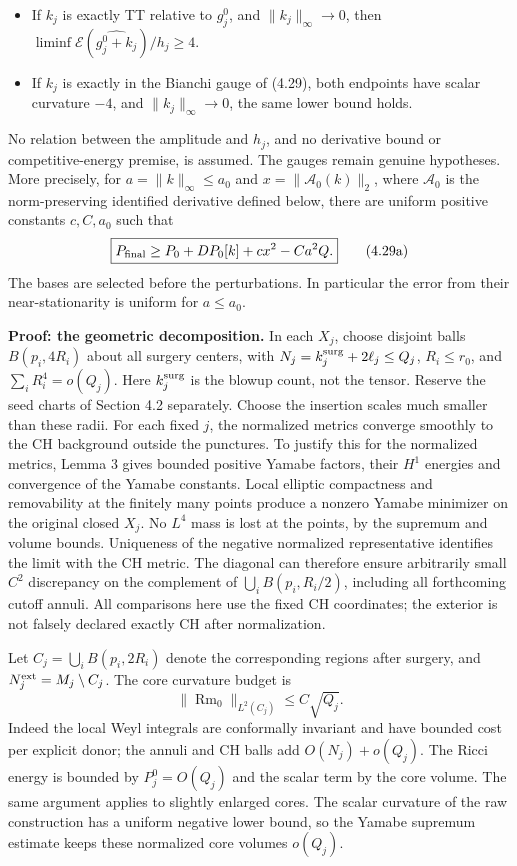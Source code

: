 \documentclass[
  11pt,
]{article}
\providecommand{\tightlist}{%
  \setlength{\itemsep}{0pt}\setlength{\parskip}{0pt}}
\begin{document}
\begin{itemize}
\tightlist
\item
  If \(k_j\) is exactly TT relative to \(g_j^0\), and
  \(\|k_j\|_\infty\to0\), then
  \(\liminf\mathcal E(\widehat{g_j^0+k_j})/h_j\ge4\).
\item
  If \(k_j\) is exactly in the Bianchi gauge of (4.29), both endpoints
  have scalar curvature \(-4\), and \(\|k_j\|_\infty\to0\), the same
  lower bound holds.
\end{itemize}

No relation between the amplitude and \(h_j\), and no derivative bound
or competitive-energy premise, is assumed. The gauges remain genuine
hypotheses. More precisely, for \(a=\|k\|_\infty\le a_0\) and
\(x=\|\mathcal A_0(k)\|_2\), where \(\mathcal A_0\) is the
norm-preserving identified derivative defined below, there are uniform
positive constants \(c,C,a_0\) such that \[
 \boxed{P_{\rm final}\ge P_0+DP_0[k]+c x^2-Ca^2Q.} \tag{4.29a}
\] The bases are selected before the perturbations. In particular the
error from their near-stationarity is uniform for \(a\le a_0\).

\textbf{Proof: the geometric decomposition.} In each \(X_j\), choose
disjoint balls \(B(p_i,4R_i)\) about all surgery centers, with
\(N_j=k_j^{\rm surg}+2\ell_j\le Q_j\), \(R_i\le r_0\), and
\(\sum_i R_i^4=o(Q_j)\). Here \(k_j^{\rm surg}\) is the blowup count,
not the tensor. Reserve the seed charts of Section 4.2 separately.
Choose the insertion scales much smaller than these radii. For each
fixed \(j\), the normalized metrics converge smoothly to the CH
background outside the punctures. To justify this for the normalized
metrics, Lemma 3 gives bounded positive Yamabe factors, their \(H^1\)
energies and convergence of the Yamabe constants. Local elliptic
compactness and removability at the finitely many points produce a
nonzero Yamabe minimizer on the original closed \(X_j\). No \(L^4\) mass
is lost at the points, by the supremum and volume bounds. Uniqueness of
the negative normalized representative identifies the limit with the CH
metric. The diagonal can therefore ensure arbitrarily small \(C^2\)
discrepancy on the complement of \(\bigcup_i B(p_i,R_i/2)\), including
all forthcoming cutoff annuli. All comparisons here use the fixed CH
coordinates; the exterior is not falsely declared exactly CH after
normalization.

Let \(C_j=\bigcup_i B(p_i,2R_i)\) denote the corresponding regions after
surgery, and \(N_j^{\rm ext}=M_j\setminus C_j\). The core curvature
budget is \[
 \|\operatorname{Rm}_0\|_{L^2(C_j)}\le C\sqrt{Q_j}. \tag{4.30}
\] Indeed the local Weyl integrals are conformally invariant and have
bounded cost per explicit donor; the annuli and CH balls add
\(O(N_j)+o(Q_j)\). The Ricci energy is bounded by \(P_j^0=O(Q_j)\) and
the scalar term by the core volume. The same argument applies to
slightly enlarged cores. The scalar curvature of the raw construction
has a uniform negative lower bound, so the Yamabe supremum estimate
keeps these normalized core volumes \(o(Q_j)\).
\end{document}
